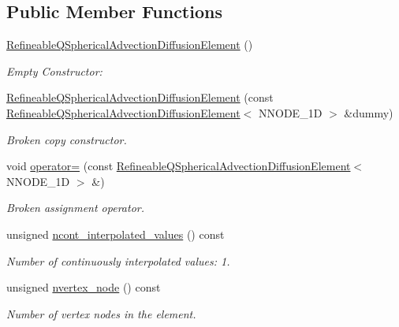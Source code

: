 \subsection*{Public Member Functions}
\begin{DoxyCompactItemize}
\item 
\hyperlink{classoomph_1_1RefineableQSphericalAdvectionDiffusionElement_ad8620ec5ee99a7ed793c5d90df04137d}{Refineable\+Q\+Spherical\+Advection\+Diffusion\+Element} ()
\begin{DoxyCompactList}\small\item\em Empty Constructor\+: \end{DoxyCompactList}\item 
\hyperlink{classoomph_1_1RefineableQSphericalAdvectionDiffusionElement_aa3610c702ea9f0634f577dc0471ff18e}{Refineable\+Q\+Spherical\+Advection\+Diffusion\+Element} (const \hyperlink{classoomph_1_1RefineableQSphericalAdvectionDiffusionElement}{Refineable\+Q\+Spherical\+Advection\+Diffusion\+Element}$<$ N\+N\+O\+D\+E\+\_\+1D $>$ \&dummy)
\begin{DoxyCompactList}\small\item\em Broken copy constructor. \end{DoxyCompactList}\item 
void \hyperlink{classoomph_1_1RefineableQSphericalAdvectionDiffusionElement_ae3b0521c03a449b0e9532186a10c109e}{operator=} (const \hyperlink{classoomph_1_1RefineableQSphericalAdvectionDiffusionElement}{Refineable\+Q\+Spherical\+Advection\+Diffusion\+Element}$<$ N\+N\+O\+D\+E\+\_\+1D $>$ \&)
\begin{DoxyCompactList}\small\item\em Broken assignment operator. \end{DoxyCompactList}\item 
unsigned \hyperlink{classoomph_1_1RefineableQSphericalAdvectionDiffusionElement_a3ad036632c6661a525cb472405e86147}{ncont\+\_\+interpolated\+\_\+values} () const
\begin{DoxyCompactList}\small\item\em Number of continuously interpolated values\+: 1. \end{DoxyCompactList}\item 
unsigned \hyperlink{classoomph_1_1RefineableQSphericalAdvectionDiffusionElement_afcf743949d8dfc8d67cdd980294e7840}{nvertex\+\_\+node} () const
\begin{DoxyCompactList}\small\item\em Number of vertex nodes in the element. \end{DoxyCompactList}\item 

\end{DoxyCompactItemize}
